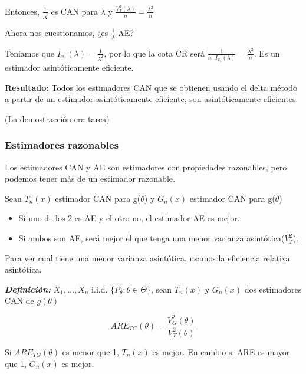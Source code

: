 Entonces, $\frac{1}{\bar{X}}$ es CAN para $\lambda$ y $\frac{V_T^2(\lambda)}{n}=\frac{\lambda^2}{n}$

Ahora nos cuestionamos, ¿es $\frac{1}{\lambda}$ AE?

Teniamos que $I_{x_1}(\lambda)=\frac{1}{\lambda^2}$, por lo que la cota CR será $\frac{1}{n \cdot I_{x_1}(\lambda)}=\frac{\lambda^2}{n}$.
Es un estimador asintóticamente eficiente.

\textbf{Resultado: }Todos los estimadores CAN que se obtienen usando el delta método a partir de un estimador asintóticamente eficiente,
son asintóticamente eficientes.

(La demostracción era tarea)

\subsubsection{Estimadores razonables}

Los estimadores CAN y AE son estimadores con propiedades razonables, pero podemos tener más de un estimador razonable.

Sean $T_n(x)$ estimador CAN para g($\theta$) y $G_n(x)$ estimador CAN para g($\theta$)
\begin{itemize}
    \item Si uno de los 2 es AE y el otro no, el estimador AE es mejor.
    \item Si ambos son AE, será mejor el que tenga una menor varianza asintótica($V_T^2$).
\end{itemize}

Para ver cual tiene una menor varianza asintótica, usamos la eficiencia relativa asintótica.

\textbf{\textit{Definición: }} $X_1,\dots,X_n$ i.i.d. $\{ P_\theta: \theta \in \Theta \}$, sean $T_n(x)$
y $G_n(x)$ dos estimadores CAN de $g(\theta)$

\[
    ARE_{TG}(\theta)=\frac{V_G^2(\theta)}{V_T^2(\theta)}
\]

Si $ARE_{TG}(\theta)$ es menor que 1, $T_n(x)$ es mejor. En cambio si ARE es mayor que 1, $G_n(x)$ es mejor.


